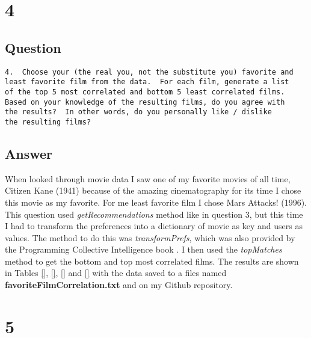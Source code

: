 \documentclass[letterpaper,11pt]{article}
\begin{document}
\clearpage


\section*{4}

\subsection*{Question}

\begin{verbatim}
4.  Choose your (the real you, not the substitute you) favorite and
least favorite film from the data.  For each film, generate a list
of the top 5 most correlated and bottom 5 least correlated films.
Based on your knowledge of the resulting films, do you agree with
the results?  In other words, do you personally like / dislike
the resulting films?
\end{verbatim}

\subsection*{Answer}

When looked through movie data I saw one of my favorite movies of all time, Citizen Kane (1941) because of the amazing cinematography for its time I chose this movie as my favorite. For me least favorite film I chose Mars Attacks! (1996). This question used \textit{getRecommendations} method like in question 3, but this time I had to transform the preferences into a dictionary of movie as key and users as values. The method to do this was \textit{transformPrefs}, which was also provided by the Programming Collective Intelligence book \cite{collectiveIntell}. I then used the \textit{topMatches} method to get the bottom and top most correlated films. The results are shown in Tables \ref{}, \ref{}, \ref{} and \ref{} with the data saved to a files named \textbf{favoriteFilmCorrelation.txt} and \textbf{} on my Github repository.

\clearpage


\section*{5}
\end{document}
